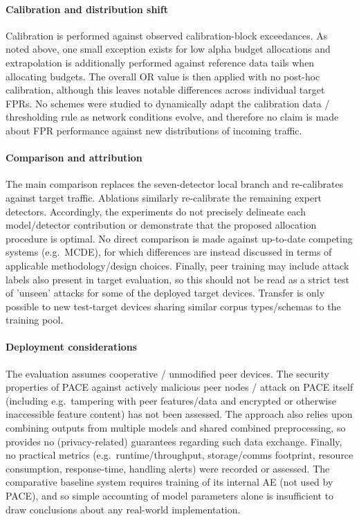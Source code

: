 \paragraph{Calibration and distribution shift} 
Calibration is performed against observed calibration-block exceedances. As noted above, one small exception exists for low alpha budget allocations and extrapolation is additionally performed against reference data tails when allocating budgets. The overall OR value is then applied with no post-hoc calibration, although this leaves notable differences across individual target FPRs. No schemes were studied to dynamically adapt the calibration data / thresholding rule as network conditions evolve, and therefore no claim is made about FPR performance against new distributions of incoming traffic.

\paragraph{Comparison and attribution} 
The main comparison replaces the seven-detector local branch and re-calibrates against target traffic. Ablations similarly re-calibrate the remaining expert detectors. Accordingly, the experiments do not precisely delineate each model/detector contribution or demonstrate that the proposed allocation procedure is optimal. No direct comparison is made against up-to-date competing systems (e.g.\ MCDE), for which differences are instead discussed in terms of applicable methodology/design choices. Finally, peer training may include attack labels also present in target evaluation, so this should not be read as a strict test of 'unseen' attacks for some of the deployed target devices. Transfer is only possible to new test-target devices sharing similar corpus types/schemas to the training pool.

\paragraph{Deployment considerations} 
The evaluation assumes cooperative / unmodified peer devices. The security properties of PACE against actively malicious peer nodes / attack on PACE itself (including e.g.\ tampering with peer features/data and encrypted or otherwise inaccessible feature content) has not been assessed. The approach also relies upon combining outputs from multiple models and shared combined preprocessing, so provides no (privacy-related) guarantees regarding such data exchange. Finally, no practical metrics (e.g.\ runtime/throughput, storage/comms footprint, resource consumption, response-time, handling alerts) were recorded or assessed. The comparative baseline system requires training of its internal AE (not used by PACE), and so simple accounting of model parameters alone is insufficient to draw conclusions about any real-world implementation.